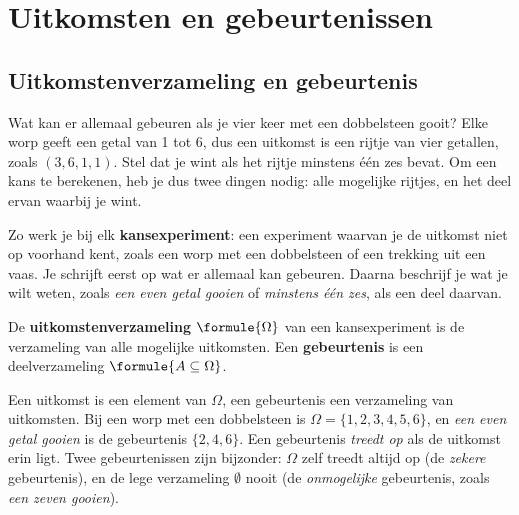 
\section{Uitkomsten en gebeurtenissen}

\subsection{Uitkomstenverzameling en gebeurtenis}

Wat kan er allemaal gebeuren als je vier keer met een dobbelsteen gooit? Elke worp geeft een getal van 1 tot 6, dus een uitkomst is een rijtje van vier getallen, zoals $(3, 6, 1, 1)$. Stel dat je wint als het rijtje minstens één zes bevat. Om een kans te berekenen, heb je dus twee dingen nodig: alle mogelijke rijtjes, en het deel ervan waarbij je wint.

Zo werk je bij elk \textbf{kansexperiment}: een experiment waarvan je de uitkomst niet op voorhand kent, zoals een worp met een dobbelsteen of een trekking uit een vaas. Je schrijft eerst op wat er allemaal kan gebeuren. Daarna beschrijf je wat je wilt weten, zoals \textit{een even getal gooien} of \textit{minstens één zes}, als een deel daarvan.

\begin{theorie}
De \textbf{\textcolor{accent}{uitkomstenverzameling}} $\formule{\Omega}$ van een kansexperiment is de verzameling van alle mogelijke uitkomsten. Een \textbf{\textcolor{accent}{gebeurtenis}} is een deelverzameling $\formule{A \subseteq \Omega}$.
\end{theorie}

Een uitkomst is een element van $\Omega$, een gebeurtenis een verzameling van uitkomsten. Bij een worp met een dobbelsteen is $\Omega = \{1, 2, 3, 4, 5, 6\}$, en \textit{een even getal gooien} is de gebeurtenis $\{2, 4, 6\}$. Een gebeurtenis \textit{treedt op} als de uitkomst erin ligt. Twee gebeurtenissen zijn bijzonder: $\Omega$ zelf treedt altijd op (de \textit{zekere} gebeurtenis), en de lege verzameling $\emptyset$ nooit (de \textit{onmogelijke} gebeurtenis, zoals \textit{een zeven gooien}).


